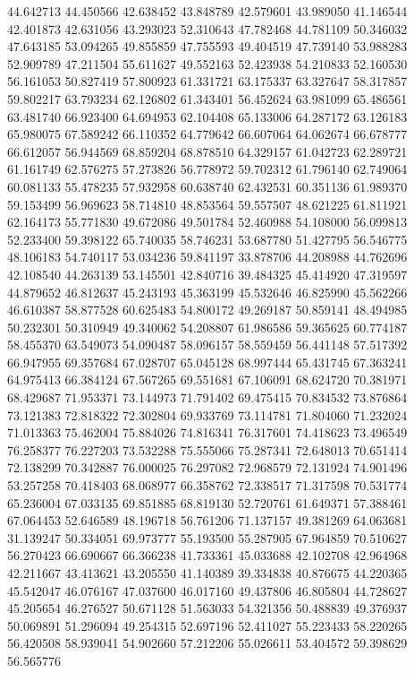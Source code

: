 44.642713
44.450566
42.638452
43.848789
42.579601
43.989050
41.146544
42.401873
42.631056
43.293023
52.310643
47.782468
44.781109
50.346032
47.643185
53.094265
49.855859
47.755593
49.404519
47.739140
53.988283
52.909789
47.211504
55.611627
49.552163
52.423938
54.210833
52.160530
56.161053
50.827419
57.800923
61.331721
63.175337
63.327647
58.317857
59.802217
63.793234
62.126802
61.343401
56.452624
63.981099
65.486561
63.481740
66.923400
64.694953
62.104408
65.133006
64.287172
63.126183
65.980075
67.589242
66.110352
64.779642
66.607064
64.062674
66.678777
66.612057
56.944569
68.859204
68.878510
64.329157
61.042723
62.289721
61.161749
62.576275
57.273826
56.778972
59.702312
61.796140
62.749064
60.081133
55.478235
57.932958
60.638740
62.432531
60.351136
61.989370
59.153499
56.969623
58.714810
48.853564
59.557507
48.621225
61.811921
62.164173
55.771830
49.672086
49.501784
52.460988
54.108000
56.099813
52.233400
59.398122
65.740035
58.746231
53.687780
51.427795
56.546775
48.106183
54.740117
53.034236
59.841197
33.878706
44.208988
44.762696
42.108540
44.263139
53.145501
42.840716
39.484325
45.414920
47.319597
44.879652
46.812637
45.243193
45.363199
45.532646
46.825990
45.562266
46.610387
58.877528
60.625483
54.800172
49.269187
50.859141
48.494985
50.232301
50.310949
49.340062
54.208807
61.986586
59.365625
60.774187
58.455370
63.549073
54.090487
58.096157
58.559459
56.441148
57.517392
66.947955
69.357684
67.028707
65.045128
68.997444
65.431745
67.363241
64.975413
66.384124
67.567265
69.551681
67.106091
68.624720
70.381971
68.429687
71.953371
73.144973
71.791402
69.475415
70.834532
73.876864
73.121383
72.818322
72.302804
69.933769
73.114781
71.804060
71.232024
71.013363
75.462004
75.884026
74.816341
76.317601
74.418623
73.496549
76.258377
76.227203
73.532288
75.555066
75.287341
72.648013
70.651414
72.138299
70.342887
76.000025
76.297082
72.968579
72.131924
74.901496
53.257258
70.418403
68.068977
66.358762
72.338517
71.317598
70.531774
65.236004
67.033135
69.851885
68.819130
52.720761
61.649371
57.388461
67.064453
52.646589
48.196718
56.761206
71.137157
49.381269
64.063681
31.139247
50.334051
69.973777
55.193500
55.287905
67.964859
70.510627
56.270423
66.690667
66.366238
41.733361
45.033688
42.102708
42.964968
42.211667
43.413621
43.205550
41.140389
39.334838
40.876675
44.220365
45.542047
46.076167
47.037600
46.017160
49.437806
46.805804
44.728627
45.205654
46.276527
50.671128
51.563033
54.321356
50.488839
49.376937
50.069891
51.296094
49.254315
52.697196
52.411027
55.223433
58.220265
56.420508
58.939041
54.902660
57.212206
55.026611
53.404572
59.398629
56.565776
